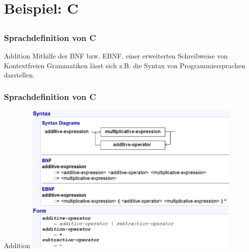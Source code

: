 
\section[Intro]{Beispiel: C}
\subsection*{}
\begin{frame}
	\frametitle{Sprachdefinition von C}
	\begin{block}{Addition}
		Mithilfe der BNF bzw. EBNF, einer erweiterten Schreibweise von Kontextfreien Grammatiken lässt sich z.B. die Syntax von Programmiersprachen darstellen.
	\end{block}
\end{frame}

\begin{frame}
	\frametitle{Sprachdefinition von C}
	\begin{block}{Addition}
		\includegraphics[width=0.8\textwidth]{src/Syntax_Addition_C}
		
	\end{block}
\end{frame}

